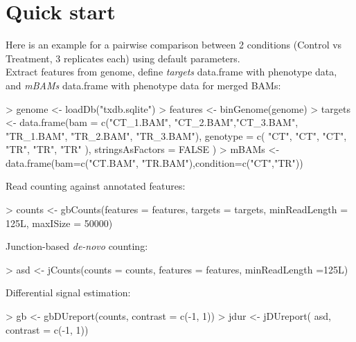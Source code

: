 \documentclass{article}
\begin{document}
\section{Quick start}\label{qstart}
Here is an example for a pairwise comparison between 2 conditions (Control vs Treatment, 3 replicates each) using default parameters. \\

Extract features from genome, define {\em targets} data.frame with phenotype data, and {\em mBAMs} data.frame with phenotype data for merged BAMs:

\begin{Schunk}
\begin{Sinput}
> genome   <- loadDb("txdb.sqlite")
> features <- binGenome(genome)
> targets  <- data.frame(bam = c("CT_1.BAM", "CT_2.BAM","CT_3.BAM",
                                "TR_1.BAM", "TR_2.BAM", "TR_3.BAM"),
                   genotype = c( "CT", "CT", "CT",  "TR", "TR", "TR" ),
                   stringsAsFactors = FALSE )
> mBAMs <- data.frame(bam=c("CT.BAM", "TR.BAM"),condition=c("CT","TR"))
\end{Sinput}
\end{Schunk}

Read counting against annotated features: 

\begin{Schunk}
\begin{Sinput}
> counts      <-  gbCounts(features = features, 
                          targets  = targets, 
                          minReadLength = 125L, 
                          maxISize = 50000)
\end{Sinput}
\end{Schunk}

Junction-based {\em de-novo} counting:

\begin{Schunk}
\begin{Sinput}
> asd         <-  jCounts(counts = counts, 
                         features = features,
                         minReadLength =125L)
\end{Sinput}
\end{Schunk}

Differential signal estimation:

\begin{Schunk}
\begin{Sinput}
> gb        <- gbDUreport(counts, contrast = c(-1, 1))
> jdur      <- jDUreport(    asd, contrast = c(-1, 1))
\end{Sinput}
\end{Schunk}
\end{document}
